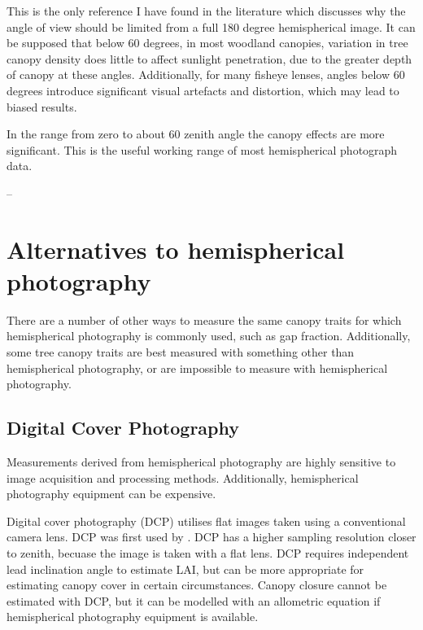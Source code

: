 \documentclass{article}
\begin{document}
This is the only reference I have found in the literature which discusses why the angle of view should be limited from a full 180 degree hemispherical image. It can be supposed that below 60 degrees, in most woodland canopies, variation in tree canopy density does little to affect sunlight penetration, due to the greater depth of canopy at these angles. Additionally, for many fisheye lenses, angles below 60 degrees introduce significant visual artefacts and distortion, which may lead to biased results. 

\begin{minipage}{\linewidth}
\begin{framed}
In the range from zero to about 60 zenith angle the canopy effects are more significant. This is the useful working range of most hemispherical photograph data.

-- \citet{Jupp2009}
\end{framed}
\end{minipage}

\section{Alternatives to hemispherical photography}

There are a number of other ways to measure the same canopy traits for which hemispherical photography is commonly used, such as gap fraction. Additionally, some tree canopy traits are best measured with something other than hemispherical photography, or are impossible to measure with hemispherical photography.

\subsection{Digital Cover Photography}

Measurements derived from hemispherical photography are highly sensitive to image acquisition and processing methods. Additionally, hemispherical photography equipment can be expensive.

Digital cover photography (DCP) utilises flat images taken using a conventional camera lens. DCP was first used by \citet{Macfarlane2007a, Macfarlane2007b, Macfarlane2007c}. DCP has a higher sampling resolution closer to zenith, becuase the image is taken with a flat lens. DCP requires independent lead inclination angle to estimate LAI, but can be more appropriate for estimating canopy cover in certain circumstances. Canopy closure cannot be estimated with DCP, but it can be modelled with an allometric equation if hemispherical photography equipment is available.
\end{document}
